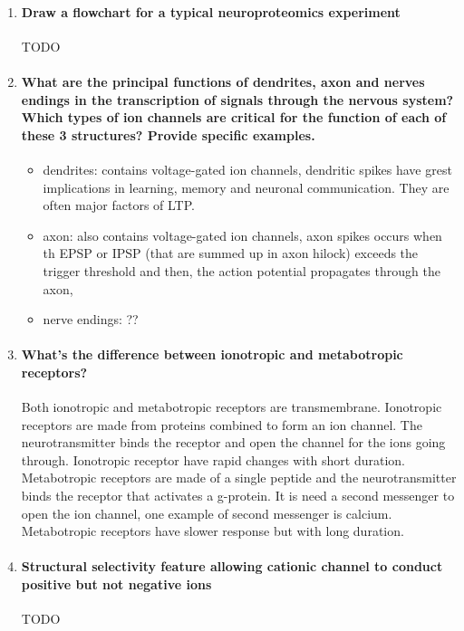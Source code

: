 \documentclass[12pt,article,oneside,a4paper]{memoir}
\begin{document}
\begin{enumerate}
\item \paragraph{Draw a flowchart for a typical neuroproteomics experiment}
TODO

\item \paragraph{What are the principal functions of dendrites, axon and nerves endings in the transcription of signals through the nervous system? Which types of ion channels are critical for the function of each of these 3 structures? Provide specific examples.}
\begin{itemize}
\item dendrites: contains voltage-gated ion channels, dendritic spikes have grest implications in learning, memory and neuronal communication. They are often major factors of LTP.
\item axon: also contains voltage-gated ion channels, axon spikes occurs when th EPSP or IPSP (that are summed up in axon hilock) exceeds the trigger threshold and then, the action potential propagates through the axon,
\item nerve endings: ??
\end{itemize}

\item \paragraph{What’s the difference between ionotropic and metabotropic receptors?} Both ionotropic and metabotropic receptors are transmembrane. Ionotropic receptors are made from proteins combined to form an ion channel. The neurotransmitter binds the receptor and open the channel for the ions going through. Ionotropic receptor have rapid changes with short duration. Metabotropic receptors are made of a single peptide and the neurotransmitter binds the receptor that activates a g-protein. It is need a second messenger to open the ion channel, one example of second messenger is calcium. Metabotropic receptors have slower response but with long duration.

\item \paragraph{Structural selectivity feature allowing cationic channel to conduct positive but not negative ions}
TODO

\end{enumerate}
\end{document}
